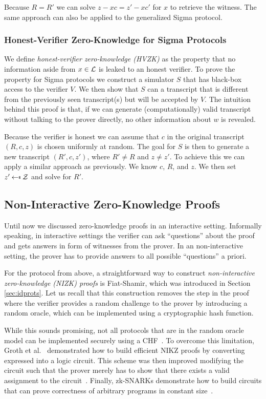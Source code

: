 Because $R=R'$ we can solve $z-xc = z'-xc'$ for $x$ to retrieve the witness. The same approach can also be applied to the generalized Sigma protocol.

\subsubsection{Honest-Verifier Zero-Knowledge for Sigma Protocols}
We define \emph{honest-verifier zero-knowledge (HVZK)} as the property that no information aside from $x \in {\cal L}$ is leaked to an honest verifier.
To prove the property for Sigma protocols we construct a simulator $S$ that has black-box access to the verifier $V$.
We then show that $S$ can a transcript that is different from the previously seen transcript(s) but will be accepted by $V$.
The intuition behind this proof is that, if we can generate (computationally) valid transcript without talking to the prover directly, no other information about $w$ is revealed.

Because the verifier is honest we can assume that $c$ in the original transcript $(R,c,z)$ is chosen uniformly at random.
The goal for $S$ is then to generate a new transcript $(R', c, z')$, where $R' \neq R$ and $z \neq z'$.
To achieve this we can apply a similar approach as previously. We know $c$, $R$, and $z$. We then set $z' \getsr \calZ$ and solve for $R'$.

\subsection{Non-Interactive Zero-Knowledge Proofs}
Until now we discussed zero-knowledge proofs in an interactive setting.
Informally speaking, in interactive settings the verifier can ask ``questions'' about the proof and gets answers in form of witnesses from the prover.
In an non-interactive setting, the prover has to provide answers to all possible ``questions'' a priori.

For the protocol from above, a straightforward way to construct \emph{non-interactive zero-knowledge (NIZK) proofs} is Fiat-Shamir, which was introduced in Section \ref{sec:idprots}.
Let us recall that this construction removes the step in the proof where the verifier provides a random challenge to the prover by introducing a random oracle, which can be implemented using a cryptographic hash function.

While this sounds promising, not all protocols that are in the random oracle model can be implemented securely using a CHF~\cite{canetti2004random}.
To overcome this limitation, Groth et al.~\cite{groth2006perfect} demonstrated how to build efficient NIKZ proofs by converting expressed into a logic circuit.
This scheme was then improved modifying the circuit such that the prover merely has to show that there exists a valid assignment to the circuit~\cite{groth10shortpairing}.
Finally, zk-SNARKs demonstrate how to build circuits that can prove correctness of arbitrary programs in constant size~\cite{ben2014succinct}.

